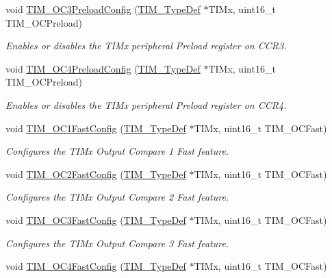 \begin{DoxyCompactItemize}
void \hyperlink{group___t_i_m_ga8b2391685a519e60e596b7d596f86f09}{T\+I\+M\+\_\+\+O\+C3\+Preload\+Config} (\hyperlink{struct_t_i_m___type_def}{T\+I\+M\+\_\+\+Type\+Def} $\ast$T\+I\+Mx, uint16\+\_\+t T\+I\+M\+\_\+\+O\+C\+Preload)
\begin{DoxyCompactList}\small\item\em Enables or disables the T\+I\+Mx peripheral Preload register on C\+C\+R3. \end{DoxyCompactList}\item 
void \hyperlink{group___t_i_m_ga8bf4dfb35ff0c7b494dd96579f50b1ec}{T\+I\+M\+\_\+\+O\+C4\+Preload\+Config} (\hyperlink{struct_t_i_m___type_def}{T\+I\+M\+\_\+\+Type\+Def} $\ast$T\+I\+Mx, uint16\+\_\+t T\+I\+M\+\_\+\+O\+C\+Preload)
\begin{DoxyCompactList}\small\item\em Enables or disables the T\+I\+Mx peripheral Preload register on C\+C\+R4. \end{DoxyCompactList}\item 
void \hyperlink{group___t_i_m_gaec82031ca62f31f5483195c09752a83a}{T\+I\+M\+\_\+\+O\+C1\+Fast\+Config} (\hyperlink{struct_t_i_m___type_def}{T\+I\+M\+\_\+\+Type\+Def} $\ast$T\+I\+Mx, uint16\+\_\+t T\+I\+M\+\_\+\+O\+C\+Fast)
\begin{DoxyCompactList}\small\item\em Configures the T\+I\+Mx Output Compare 1 Fast feature. \end{DoxyCompactList}\item 
void \hyperlink{group___t_i_m_ga413359c87f46c69f1ffe2dc8fb3a65e7}{T\+I\+M\+\_\+\+O\+C2\+Fast\+Config} (\hyperlink{struct_t_i_m___type_def}{T\+I\+M\+\_\+\+Type\+Def} $\ast$T\+I\+Mx, uint16\+\_\+t T\+I\+M\+\_\+\+O\+C\+Fast)
\begin{DoxyCompactList}\small\item\em Configures the T\+I\+Mx Output Compare 2 Fast feature. \end{DoxyCompactList}\item 
void \hyperlink{group___t_i_m_gab2f3698e6e56bd9b0a4be7056ba789e1}{T\+I\+M\+\_\+\+O\+C3\+Fast\+Config} (\hyperlink{struct_t_i_m___type_def}{T\+I\+M\+\_\+\+Type\+Def} $\ast$T\+I\+Mx, uint16\+\_\+t T\+I\+M\+\_\+\+O\+C\+Fast)
\begin{DoxyCompactList}\small\item\em Configures the T\+I\+Mx Output Compare 3 Fast feature. \end{DoxyCompactList}\item 
void \hyperlink{group___t_i_m_ga58279a04e8ea5333f1079d3cce8dde12}{T\+I\+M\+\_\+\+O\+C4\+Fast\+Config} (\hyperlink{struct_t_i_m___type_def}{T\+I\+M\+\_\+\+Type\+Def} $\ast$T\+I\+Mx, uint16\+\_\+t T\+I\+M\+\_\+\+O\+C\+Fast)

\end{DoxyCompactItemize}
